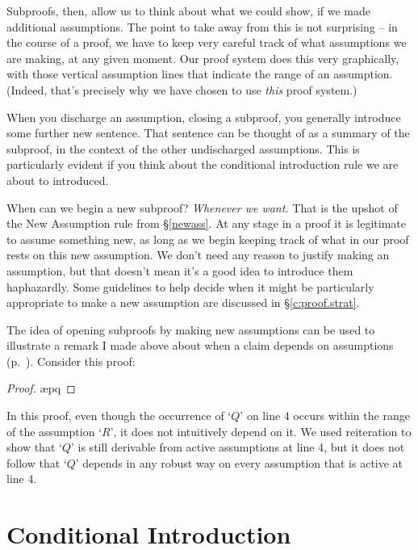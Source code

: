 Subproofs, then, allow us to think about what we could show, if we made additional assumptions. The point to take away from this is not surprising – in the course of a proof, we have to keep very careful track of what assumptions we are making, at any given moment. Our proof system does this very graphically, with those vertical assumption lines that indicate the range of an assumption. (Indeed, that's precisely why we have chosen to use \emph{this} proof system.) 

When you discharge an assumption, closing a subproof, you generally introduce some further new sentence. That sentence can be thought of as a summary of the subproof, in the context of the other undischarged assumptions. This is particularly evident if you think about the conditional introduction rule we are about to introduced.

When can we begin a new subproof? \emph{Whenever we want.} That is the upshot of the New Assumption rule from §\ref{newass}. At any stage in a proof it is legitimate to assume something new, as long as we begin keeping track of what in our proof rests on this new assumption. We don't need any reason to justify making an assumption, but that doesn't mean it's a good idea to introduce them  
haphazardly. Some guidelines to help decide when it might be particularly appropriate to make a new assumption are discussed in §\ref{c:proof.strat}.

The idea of opening subproofs by making new assumptions can be used to illustrate a remark I made above about when a claim depends on assumptions (p.\ \pageref{nondependence}). Consider this proof: \begin{proof}
	\ae{pq}
	\open {}
\end{proof} In this proof, even though the occurrence of `$Q$' on line 4 occurs within the range of the assumption `$R$', it does not intuitively depend on it. We used reiteration to show that `$Q$' is still derivable from active assumptions at line 4, but it does not follow that `$Q$' depends in any robust way on every assumption that is active at line 4. 

\section{Conditional Introduction}\label{condint}

